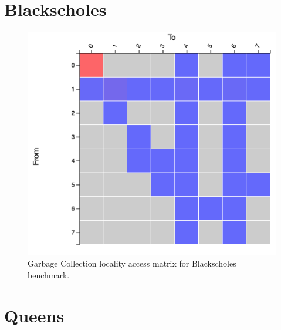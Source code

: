 \documentclass[a4paper,11pt]{article}
\begin{document}
\section{Blackscholes}

\begin{table}[!htb]
  \centering
  \caption{Garbage Collection frequencies per region and per generation.}
  \label{table:baseline}
\end{table}

\begin{figure}[!htb]
    \centering
    \includegraphics[width=0.6\linewidth]{TechMemo/gc/images/bscholes_gc.png}
    \caption{Garbage Collection locality access matrix for Blackscholes benchmark.}
    \label{fig:my_label}
\end{figure}

\section{Queens}

\begin{table}[!htb]
  \centering
  \caption{Garbage Collection frequencies per region and per generation.}
  \label{table:baseline}
\end{table}
\end{document}
